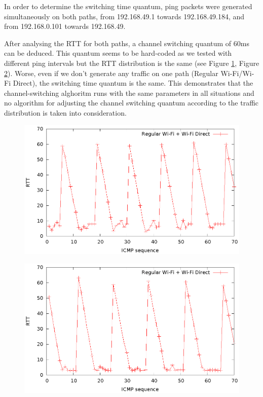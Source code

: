 In order to determine the switching time quantum, ping packets were generated simultaneously on both paths, from 192.168.49.1 towards 192.168.49.184, and from 192.168.0.101 towards 192.168.49.

After analysing the RTT for both paths, a channel switching quantum of 60ms can be deduced. This quantum seems to be hard-coded as we tested with different ping intervals but the RTT distribution is the same (see Figure \ref{img:regular-wifi}, Figure \ref{img:wifi-direct}). Worse, even if we don't generate any traffic on one path (Regular Wi-Fi/Wi-Fi Direct), the switching time quantum is the same. This demonstrates that the channel-switching alghoritm runs with the same parameters in all situations and no algorithm for adjusting the channel switching quantum according to the traffic distribution is taken into consideration.

\begin{figure}[h!]
\includegraphics{src/img/regularwifi.eps}
\label{img:regular-wifi}
\end{figure}

\begin{figure}[h!]
\includegraphics{src/img/wifidirectping.eps}
\label{img:wifi-direct}
\end{figure}

